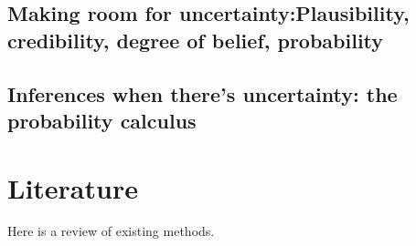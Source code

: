 \documentclass[]{book}
\begin{document}
\hypertarget{making-room-for-uncertainty-plausibility-credibility-degree-of-belief-probability}{%
\section{\texorpdfstring{Making room for uncertainty:Plausibility, credibility, degree of belief, probability}{Making room for uncertainty: Plausibility, credibility, degree of belief, probability}}\label{making-room-for-uncertainty-plausibility-credibility-degree-of-belief-probability}}

\hypertarget{inferences-when-theres-uncertainty-the-probability-calculus}{%
\section{Inferences when there's uncertainty: the probability calculus}\label{inferences-when-theres-uncertainty-the-probability-calculus}}

\hypertarget{literature}{%
\chapter{Literature}\label{literature}}

Here is a review of existing methods.


\end{document}
